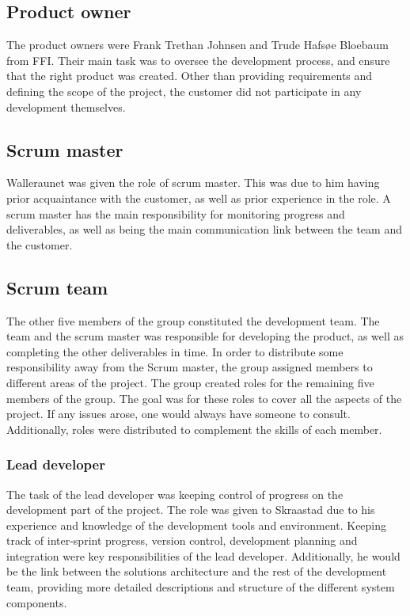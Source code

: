 \subsection{Product owner}
\label{subsec:process_and_methodology-project_organization-product_owner}

The product owners were Frank Trethan Johnsen and Trude Hafsøe Bloebaum from FFI. Their main task was to oversee the development process, and ensure that the right product was created. Other than providing requirements and defining the scope of the project, the customer did not participate in any development themselves.

\subsection{Scrum master}
\label{subsec:process_and_methodology-project_organization-scrum_master}

Walleraunet was given the role of scrum master. This was due to him having prior acquaintance with the customer, as well as prior experience in the role. A scrum master has the main responsibility for monitoring progress and deliverables, as well as being the main communication link between the team and the customer.

\subsection{Scrum team}
\label{subsec:process_and_methodology-project_organization-scrum_team}

The other five members of the group constituted the development team. The team and the scrum master was responsible for developing the product, as well as completing the other deliverables in time. In order to distribute some responsibility away from the Scrum master, the group assigned members to different areas of the project. The group created roles for the remaining five members of the group. The goal was for these roles to cover all the aspects of the project. If any issues arose, one would always have someone to consult. Additionally, roles were distributed to complement the skills of each member.

\subsubsection{Lead developer}
\label{subsec:process_and_methodology-project_organization-lead_developer}

The task of the lead developer was keeping control of progress on the development part of the project. The role was given to Skraastad due to his experience and knowledge of the development tools and environment. Keeping track of inter-sprint progress, version control, development planning and integration were key responsibilities of the lead developer. Additionally, he would be the link between the solutions architecture and the rest of the development team, providing more detailed descriptions and structure of the different system components.

